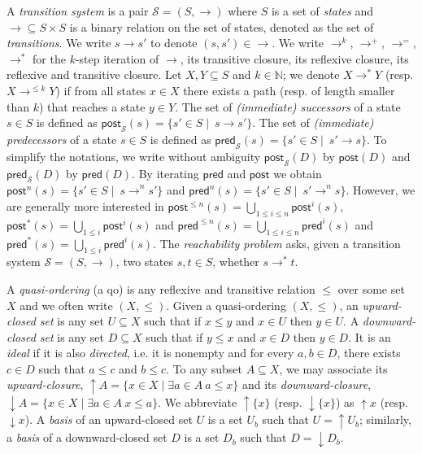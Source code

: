 \documentclass[runningheads]{llncs}
\newcommand{\pred}{\textsf{pred}}
\newcommand{\post}{\textsf{post}}
\begin{document}
\noindent
 A {\em transition system} is a pair $\mathscr{S} = (S,\rightarrow )$ where $S$ is a set of 
 {\em states} and  
 $ {\rightarrow} \subseteq S \times S$ is a
 binary relation 
 on
 the set of states, denoted as the set of {\em transitions}. 
%
We write $s \rightarrow s'$ to denote $ (s,s') \in  {\rightarrow} $.
We write $\rightarrow^{k}$, $\rightarrow^{+}$, $\rightarrow^{=}$, $\rightarrow^{*}$
for the $k$-step iteration of $\rightarrow$, its transitive closure, its reflexive closure, its reflexive and transitive closure.
Let $X,Y \subseteq S$ and $k \in \mathbb{N}$; we denote $X \longrightarrow^{*} Y$ (resp. $X \longrightarrow^{\leq k} Y$) if from all states $x \in X$ there exists a path (resp. of length smaller than $k$) that reaches a state $y \in Y$.
\noindent
The set of {\em (immediate) successors} of a state $s \in S$ is defined as 
 $\post_{\mathscr{S}}(s) = \{ s' \in S \mid  ~ s \xrightarrow{} s'\}$. 
The set of {\em (immediate) predecessors} of a state $s \in S$ is deﬁned as
 $\pred_{\mathscr{S}}(s) = \{ s' \in S \mid  ~ s' \xrightarrow{} s\}$. 
To simplify the notations, we write without ambiguity $\post_{\mathscr{S}}(D)$ by $\post(D)$ and  $\pred_{\mathscr{S}}(D)$ by  $\pred(D)$.
By iterating $\pred$ and $\post$ we obtain  
$\post^n(s) = \{ s' \in S \mid  ~ s \xrightarrow{}^n s'\}$
and
$\pred^n(s) = \{ s' \in S \mid  ~ s' \xrightarrow{}^n s\}$.
However, we are generally more interested in
$\post^{\leq n}(s) = \bigcup_{1 \leq i \leq n} \post^i(s)$, $\post^*(s)= \bigcup_{1 \leq i} \post^i(s)$
and
$\pred^{\leq n}(s) = \bigcup_{1 \leq i \leq n} \pred^i(s)$ and $\pred^*(s) = \bigcup_{1 \leq i} \pred^i(s)$. 
The {\em reachability problem} asks, given a transition system $\mathscr{S} = (S, \to)$, two states $s, t \in S$, whether $s \to^* t$. 

%


A {\em quasi-ordering} (a qo) is any reflexive and transitive relation $\leq$ over some set $X$ and we often write $(X,\leq)$. 
Given a quasi-ordering $(X,\leq)$, an {\em upward-closed set} is any set $U \subseteq X$ such that if $x \leq y$ and $x \in U$ then $y \in U $.
A {\em downward-closed set} is any set $D \subseteq X$ such that if $y \leq x$ and $x \in D$ then $y \in D $. 
It is an {\em ideal } if it is also {\em directed}, i.e. it is nonempty and for every $a,b \in D$, there exists $c \in D$ such that $a \leq c$ and $b \leq c$.
To any subset $A \subseteq X$, we may associate
its {\em upward-closure},
 $\mathop{\uparrow} A = \{x \in X \mid \exists a \in A ~ a \leq x\}$
 and its 
 {\em downward-closure},
 $\mathop{\downarrow} A = \{x \in X \mid \exists a \in A ~ x \leq a\}$. 
We abbreviate $\mathop{\uparrow} \{x\}$ (resp. $\mathop{\downarrow} \{x\}$)
as $\mathop{\uparrow} x$ (resp. $\mathop{\downarrow} x$).
%
A {\em basis} of an upward-closed set $U$ is a set $U_b$ such that $U = \mathop{\uparrow} U_b$; similarly, a {\em basis} of a downward-closed set $D$ is a set $D_b$ such that $D = \mathop{\downarrow} D_b$.
\end{document}
